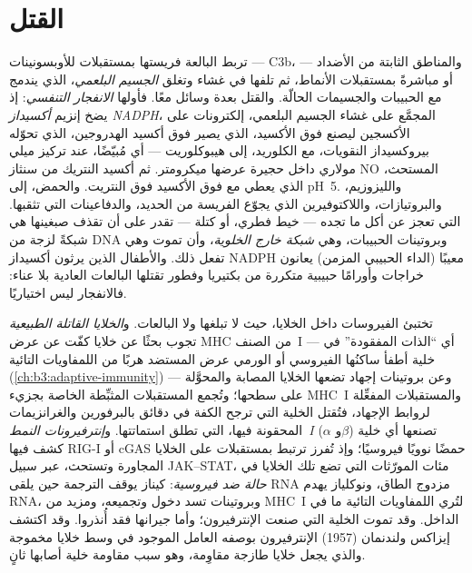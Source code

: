 \section{القتل}

\begin{definition}\label{def:b3:innate-immunity:killing}
تربط البالعة فريستها بمستقبلات للأوبسونينات --- C3b،
والمناطق الثابتة من الأضداد --- أو مباشرةً بمستقبلات
الأنماط، ثم تلفها في غشاء وتغلق \emph{الجسيم البلعمي}، الذي
يندمج مع الحبيبات والجسيمات الحالّة. والقتل بعدة وسائل
معًا. فأولها \emph{الانفجار التنفسي}: إذ يضخ إنزيم
\emph{أكسيداز NADPH}، المجمَّع على غشاء الجسيم البلعمي،
إلكترونات على الأكسجين ليصنع فوق الأكسيد، الذي يصير فوق
أكسيد الهدروجين، الذي تحوّله بيروكسيداز النقويات، مع
الكلوريد، إلى هيبوكلوريت --- أي مُبيّضًا، عند تركيز ميلي
مولاري داخل حجيرة عرضها ميكرومتر. ثم أكسيد النتريك من سنثاز
NO المستحث، الذي يعطي مع فوق الأكسيد فوق النتريت. والحمض،
إلى pH~5. والليزوزيم، والبروتيازات، واللاكتوفيرين الذي
يجوّع الفريسة من الحديد، والدفاعينات التي تثقبها. 
التي تعجز عن أكل ما تجده --- خيط فطري، أو كتلة --- تقدر على
أن تقذف صبغينها هي شبكةً لزجة من DNA وبروتينات الحبيبات،
وهي \emph{شبكة  خارج الخلوية}، وأن تموت وهي تفعل
ذلك. والأطفال الذين يرثون أكسيداز NADPH معيبًا (الداء
الحبيبي المزمن) يعانون خراجات وأورامًا حبيبية متكررة من
بكتيريا وفطور تقتلها البالعات العادية بلا عناء: فالانفجار
ليس اختياريًا.
\end{definition}

\begin{definition}\label{def:b3:innate-immunity:nk-ifn}
تختبئ الفيروسات داخل الخلايا، حيث لا تبلغها  ولا
البالعات. و\emph{الخلايا القاتلة الطبيعية} تجوب بحثًا عن
خلايا كفّت عن عرض MHC من الصنف~I --- أي ``الذات المفقودة''
في خلية أطفأ ساكنُها الفيروسي أو الورمي عرض المستضد هربًا
من اللمفاويات التائية (\cref{ch:b3:adaptive-immunity}) ---
وعن بروتينات إجهاد تضعها الخلايا المصابة والمحوَّلة على
سطحها؛ وتُجمع المستقبلات المثبِّطة الخاصة بجزيء MHC~I
والمستقبلات المفعِّلة لروابط الإجهاد، فتُقتل الخلية التي
ترجح الكفة في دقائق بالبرفورين والغرانزيمات المحقونة فيها،
التي تطلق استماتتها. و\emph{إنترفيرونات النمط~I} ($\alpha$
و$\beta$) تصنعها أي خلية كشف فيها RIG-I أو cGAS حمضًا نوويًا
فيروسيًا؛ وإذ تُفرز ترتبط بمستقبلات على الخلايا المجاورة
وتستحث، عبر سبيل JAK--STAT، مئات المورّثات التي تضع تلك
الخلايا في \emph{حالة ضد فيروسية}: كيناز يوقف الترجمة حين
يلقى RNA مزدوج الطاق، ونوكلياز يهدم RNA، وبروتينات تسد دخول
 وتجميعه، ومزيد من MHC~I لتُري اللمفاويات التائية ما
في الداخل. وقد تموت الخلية التي صنعت الإنترفيرون؛ وأما
جيرانها فقد أُنذروا. وقد اكتشف إيزاكس ولندنمان (1957)
الإنترفيرون بوصفه العامل الموجود في وسط خلايا مخموجة 
والذي يجعل خلايا طازجة مقاوِمة، وهو سبب مقاومة خلية أصابها
  ثانٍ.
\end{definition}

